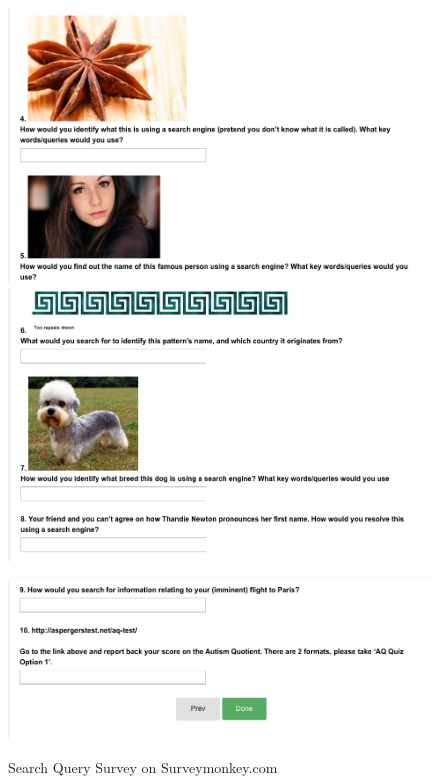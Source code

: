 \documentclass[a4paper, 11pt]{article}
\begin{document}
\newpage
\begin{figure}[H]
\begin{center}
\includegraphics[scale=0.5]{survey5}\\
\includegraphics[scale=0.5]{survey6}\\
\end{center}
\end{figure}

\newpage
\begin{figure}[H]
\begin{center}
\includegraphics[scale=0.5]{survey7}\\
\caption{Search Query Survey on Surveymonkey.com \cite{surveymonkey}}
\end{center}
\end{figure}
\end{document}
